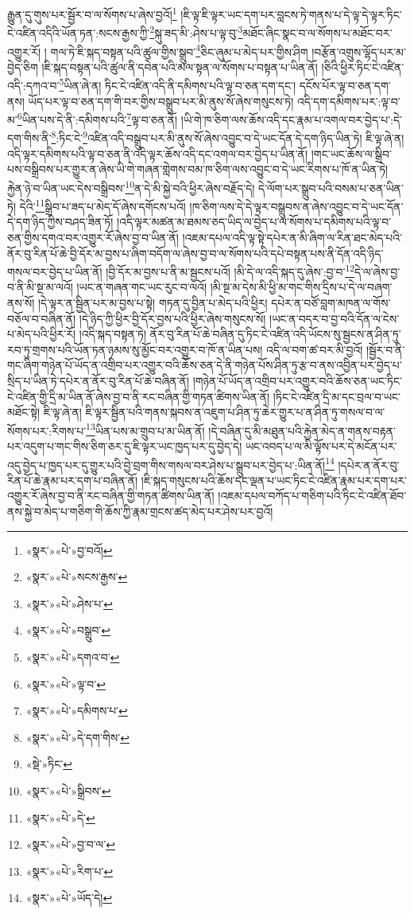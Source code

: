 རྒྱུན་དུ་གུས་པར་སྦྱོར་བ་ལ་སོགས་པ་ཞེས་བྱའོ།\footnote{«སྣར་»«པེ་»བྱ་བའོ།} །ཇི་ལྟ་ཇི་ལྟར་ཡང་དག་པར་བླངས་ཏེ་གནས་པ་དེ་ལྟ་དེ་ལྟར་ཏིང་ངེ་འཛིན་འདིའི་ཡོན་ཏན་:སངས་རྒྱས་ཀྱི་\footnote{«སྣར་»«པེ་»སངས་རྒྱས་}སྐུ་ཟད་མི་:ཤེས་པ་ལྟ་བུ་\footnote{«སྣར་»«པེ་»ཤེས་པ་}མཐོང་ཞིང་སྣང་བ་ལ་སོགས་པ་མཐོང་བར་འགྱུར་རོ། །
གལ་ཏེ་ཇི་སྐད་བསྟན་པའི་ཚུལ་གྱིས་སྒྲུབ་\footnote{«སྣར་»«པེ་»བསྒྲུབ་}ཅིང་ཞུམ་པ་མེད་པར་གྱིས་ཤིག །བརྩོན་འགྲུས་ལྷོད་པར་མ་བྱེད་ཅིག །ཇི་སྐད་བསྟན་པའི་ཚུལ་ནི་དབེན་པའི་མལ་སྟན་ལ་སོགས་པ་བསྟན་པ་ཡིན་ནོ། །ཅིའི་ཕྱིར་ཏིང་ངེ་འཛིན་འདི་:དཀའ་བ་\footnote{«སྣར་»«པེ་»དགའ་བ་}ཡིན་ཞེ་ན། ཏིང་ངེ་འཛིན་འདི་ནི་དམིགས་པའི་ལྟ་བ་ཅན་དག་དང་། དངོས་པོར་ལྟ་བ་ཅན་དག་ནས། ཡོད་པར་ལྟ་བ་ཅན་དག་གི་བར་གྱིས་བསྒྲུབ་པར་མི་ནུས་སོ་ཞེས་གསུངས་ཏེ། འདི་དག་དམིགས་པར་:ལྟ་བ་མ་\footnote{«སྣར་»«པེ་»ལྟ་བ་}ཡིན་པས་དེ་ནི་:དམིགས་པའི་\footnote{«སྣར་»«པེ་»དམིགས་པ་}ལྟ་བ་ཅན་ནོ། །ཡི་གེ་ཁ་ཅིག་ལས་ཆོས་འདི་དང་རྣམ་པ་འགལ་བར་བྱེད་པ་:དེ་དག་གིས་ནི་\footnote{«སྣར་»«པེ་»དེ་དག་གིས་}:ཏིང་ངེ་\footnote{«སྡེ་»ཏིང་}འཛིན་འདི་བསྒྲུབ་པར་མི་ནུས་སོ་ཞེས་འབྱུང་བ་དེ་ཡང་དོན་དེ་དག་ཉིད་ཡིན་ཏེ། ཇི་ལྟ་ཞེ་ན། འདི་ལྟར་དམིགས་པའི་ལྟ་བ་ཅན་ནི་འདི་ལྟར་ཆོས་འདི་དང་འགལ་བར་བྱེད་པ་ཡིན་ནོ། །གང་ཡང་ཆོས་ལ་སྒྲིབ་པས་བསྒྲིབས་པར་གྱུར་ན་ཞེས་ཡི་གེ་གཞན་གླེགས་བམ་ཁ་ཅིག་ལས་འབྱུང་བ་དེ་ཡང་རིགས་པ་ཁོ་ན་ཡིན་ཏེ། རྐྱེན་ཉེ་བ་ཡིན་ཡང་དེས་བསྒྲིབས་\footnote{«སྣར་»«པེ་»སྒྲིབས་}ན་དེ་མི་སྐྱེ་བའི་ཕྱིར་ཞེས་བརྗོད་དེ། དེ་ལོག་པར་སྒྲུབ་པའི་བསམ་པ་ཅན་ཡིན་ཏེ། དེའི་\footnote{«སྣར་»«པེ་»དེ་}སྒྲིབ་པ་ཟད་པ་མེད་དོ་ཞེས་དགོངས་པའོ། །ཁ་ཅིག་ལས་དེ་དེ་ལྟར་བསྒྲུབས་ན་ཞེས་འབྱུང་བ་དེ་ཡང་དོན་དེ་དག་ཉིད་ཀྱིས་བཤད་ཟིན་ཏོ། །འདི་ལྟར་མཚན་མ་ཐམས་ཅད་ཡིད་ལ་བྱེད་པ་ལ་སོགས་པ་དམིགས་པའི་ལྟ་བ་ཅན་གྱིས་དགའ་བར་འགྱུར་རོ་ཞེས་བྱ་བ་ཡིན་ནོ། །འཇམ་དཔལ་འདི་ལྟ་སྟེ་དཔེར་ན་མི་ཞིག་ལ་རིན་ཐང་མེད་པའི་ནོར་བུ་རིན་པོ་ཆེ་བྱི་དོར་མ་བྱས་པ་ཞིག་བདོག་ལ་ཞེས་བྱ་བ་ལ་སོགས་པའི་དཔེ་བསྟན་པས་ནི་དོན་འདི་ཉིད་གསལ་བར་བྱེད་པ་ཡིན་ནོ། །བྱི་དོར་མ་བྱས་པ་ནི་མ་སྦྱངས་པའོ། །མི་དེ་ལ་འདི་སྐད་དུ་ཞེས་:བྱ་བ་\footnote{«སྣར་»«པེ་»བྱ་བ་ལ་}དེ་ལ་ཞེས་བྱ་བ་ནི་མི་སྔ་མ་ལའོ། །ཡང་ན་གཞན་གང་ཡང་རུང་བ་ལའོ། །མི་སྔ་མ་དེས་མི་ཕྱི་མ་གང་གིས་དྲིས་པ་དེ་ལ་བཞག་ནས་སོ། །དེ་ལྟར་ན་སྦྱིན་པར་མ་བྱས་པ་སྟེ། གཏན་དུ་བྱིན་པ་མེད་པའི་ཕྱིར། དཔེར་ན་བཙོ་བླག་མཁན་ལ་གོས་བཅོལ་བ་བཞིན་ནོ། །དེ་ཉིད་ཀྱི་ཕྱིར་བྱི་དོར་བྱས་པའི་ཕྱིར་ཞེས་གསུངས་སོ། །ཡང་ན་བདར་བ་བྱ་བའི་དོན་ལ་ངེས་པ་མེད་པའི་ཕྱིར་རོ། །འདི་སྐད་བསྟན་ཏེ། ནོར་བུ་རིན་པོ་ཆེ་བཞིན་དུ་ཏིང་ངེ་འཛིན་འདི་ཡོངས་སུ་སྦྱངས་ན་ཤིན་ཏུ་རབ་ཏུ་གྲགས་པའི་ཡོན་ཏན་ཉམས་སུ་མྱོང་བར་འགྱུར་བ་ཁོ་ན་ཡིན་པས། འདི་ལ་བག་ཚ་བར་མི་བྱའོ། །སྦྱོར་བ་ནི་གང་ཞིག་གཉེན་པོ་ཡོད་ན་འགྲིབ་པར་འགྱུར་བའི་ཆོས་ཅན་དེ་ནི་གཉེན་པོས་ཤིན་ཏུ་རྩ་བ་ནས་འབྱིན་པར་བྱེད་པ་སྲིད་པ་ཡིན་ཏེ་དཔེར་ན་ནོར་བུ་རིན་པོ་ཆེ་བཞིན་ནོ། །གཉེན་པོ་ཡོད་ན་འགྲིབ་པར་འགྱུར་བའི་ཆོས་ཅན་ཡང་ཏིང་ངེ་འཛིན་གྱི་དྲི་མ་ཡིན་ནོ་ཞེས་བྱ་བ་ནི་རང་བཞིན་གྱི་གཏན་ཚིགས་ཡིན་ནོ། །ཏིང་ངེ་འཛིན་དྲི་མ་དང་བྲལ་བ་ཡང་མཐོང་སྟེ། ཇི་ལྟ་ཞེ་ན། ཇི་ལྟར་སྦྱིན་པའི་གནས་སྐབས་ན་འཇུག་པ་ཤིན་ཏུ་ཆེར་གྱུར་པ་ན་ཤིན་ཏུ་གསལ་བ་ལ་སོགས་པར་:རིགས་པ་\footnote{«སྣར་»«པེ་»རིག་པ་}ཡིན་པས་མ་གྲུབ་པ་མ་ཡིན་ནོ། །དེ་བཞིན་དུ་མི་མཐུན་པའི་རྐྱེན་མེད་ན་གནས་བརྟན་པར་འདུག་པ་གང་གིས་ཅིག་ཅར་དུ་ཇི་ལྟར་ཡང་ཁྱད་པར་དུ་བྱེད་དེ། ཡང་འབད་པ་ལ་མི་ལྟོས་པར་དེ་མངོན་པར་འདུ་བྱེད་པ་ཁྱད་པར་དུ་གྱུར་པའི་བྱེ་བྲག་གིས་གསལ་བར་ཤེས་པ་སྒྲུབ་པར་བྱེད་པ་:ཡིན་ནོ།\footnote{«སྣར་»«པེ་»ཡོད་དེ།} །དཔེར་ན་ནོར་བུ་རིན་པོ་ཆེ་རྣམ་པར་དག་པ་བཞིན་ནོ། །ཇི་སྐད་གསུངས་པའི་ཆོས་དང་ལྡན་པ་ཡང་ཏིང་ངེ་འཛིན་རྣམ་པར་དག་པར་འགྱུར་རོ་ཞེས་བྱ་བ་ནི་རང་བཞིན་གྱི་གཏན་ཚིགས་ཡིན་ནོ། །འཇམ་དཔལ་བཀོད་པ་གཅིག་པའི་ཏིང་ངེ་འཛིན་ཐོབ་ནས་སྐྱེ་བ་མེད་པ་གཅིག་གི་ཆོས་ཀྱི་རྣམ་གྲངས་ཚད་མེད་པར་ཤེས་པར་བྱའོ། 